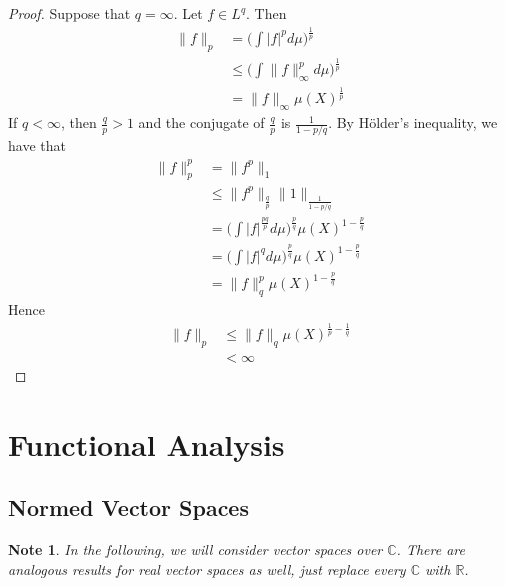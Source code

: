 \documentclass[12pt]{amsart}
\newtheorem{note}[thm]{Note}
\newcommand{\C}{\mathbb{C}}
\newcommand{\R}{\mathbb{R}}
\begin{document}
	\begin{proof}
		Suppose that $q = \infty$. Let $f \in L^q$. Then
		\begin{align*}
			\|f \|_p 
			&= \bigg(\int \vert f \vert^p d \mu \bigg)^{\frac{1}{p}} \\
			& \leq \bigg(\int \| f \|_{\infty} ^p d \mu \bigg)^{\frac{1}{p}} \\
			&= \|f \|_{\infty} \mu(X)^{\frac{1}{p}}
		\end{align*} 
		If $q < \infty$, then $\frac{q}{p} > 1$ and the conjugate of $\frac{q}{p}$ is $\frac{1}{1- p/q}$. By Hölder's inequality, we have that 
		\begin{align*}
			\|f \|_p^p 
			&= \|f^p \|_1 \\
			&\leq \|f^p \|_{\frac{q}{p}} \|1 \|_{\frac{1}{1-p/q}} \\
			&= \bigg(\int |f|^{\frac{pq}{p}} d \mu \bigg)^{\frac{p}{q}} \mu(X)^{1-\frac{p}{q}} \\
			&= \bigg(\int |f|^{q} d \mu \bigg)^{\frac{p}{q}}\mu(X)^{1-\frac{p}{q}} \\
			&= \|f \|_q^p\mu(X)^{1-\frac{p}{q}}
		\end{align*}
		Hence 
		\begin{align*}
			\|f \|_p 
			&\leq \|f \|_q\mu(X)^{\frac{1}{p}-\frac{1}{q}} \\
			&< \infty
		\end{align*}
	\end{proof}
	
	
	
	
	
	
	
	
	
	
	
	
	
	
	
	
	
	
	
	
	
	
	
	
	
	
	
	
	
	
	\section{Functional Analysis}
	
	\subsection{Normed Vector Spaces}
	\begin{note}
		In the following, we will consider vector spaces over $\C$. There are analogous results for real vector spaces as well, just replace every $\C$ with $\R$.
	\end{note}
	
\end{document}
